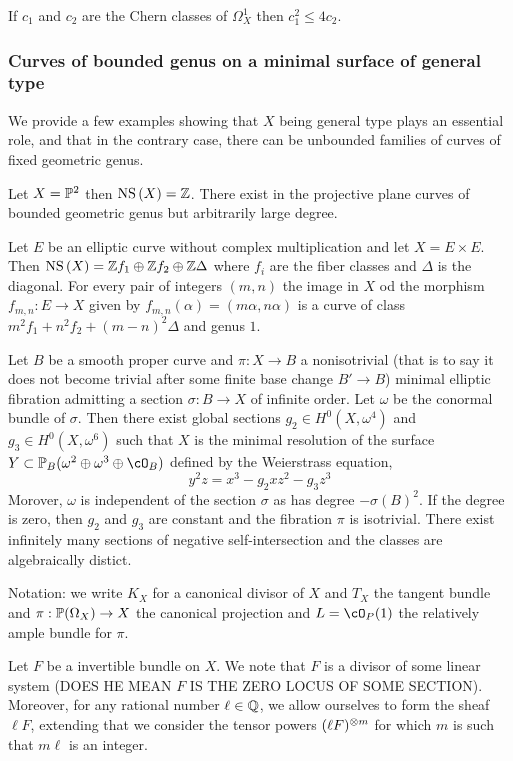 \documentclass[12pt]{article}
\begin{document}
\begin{cor}
If $c_1$ and $c_2$ are the Chern classes of $\Omega^1_X$ then $c_1^2 \le 4 c_2$. 
\end{cor}

\subsubsection{Curves of bounded genus on a minimal surface of general type}

We provide a few examples showing that $X$ being general type plays an essential role, and that in the contrary case, there can be unbounded families of curves of fixed geometric genus.

\begin{example}
Let $X = \P^2$ then $\NS{X} = \Z$. There exist in the projective plane curves of bounded geometric genus but arbitrarily large degree.
\end{example} 

\begin{example}
Let $E$ be an elliptic curve without complex multiplication and let $X = E \times E$. Then $\NS{X} = \Z f_1 \oplus \Z f_2 \oplus \Z \Delta$ where $f_i$ are the fiber classes and $\Delta$ is the diagonal. For every pair of integers $(m, n)$ the image in $X$ od the morphism $f_{m,n} : E \to X$ given by $f_{m,n}(\alpha) = (m \alpha, n \alpha)$ is a curve of class $m^2 f_1 + n^2 f_2 + (m-n)^2 \Delta$ and genus $1$.
\end{example}

\begin{example}
Let $B$ be a smooth proper curve and $\pi : X \to B$ a nonisotrivial (that is to say it does not become trivial after some finite base change $B' \to B$) minimal elliptic fibration admitting a section $\sigma : B \to X$ of infinite order. Let $\omega$ be the conormal bundle of $\sigma$. Then there exist global sections $g_2 \in H^0(X, \omega^4)$ and $g_3 \in H^0(X, \omega^6)$ such that $X$ is the minimal resolution of the surface $Y \subset \P_B(\omega^2 \oplus \omega^3 \oplus \cO_B)$ defined by the Weierstrass equation,
\[ y^2 z = x^3 - g_2 x z^2 - g_3 z^3 \]
Morover, $\omega$ is independent of the section $\sigma$ as has degree $- \sigma(B)^2$. If the degree is zero, then $g_2$ and $g_3$ are constant and the fibration $\pi$ is isotrivial. There exist infinitely many sections of negative self-intersection and the classes are algebraically distict. 
\end{example}

Notation: we write $K_X$ for a canonical divisor of $X$ and $T_X$ the tangent bundle and $\pi : \P(\Omega_X) \to X$ the canonical projection and $L = \cO_P(1)$ the relatively ample bundle for $\pi$.
\par 
Let $F$ be a invertible bundle on $X$. We note that $F$ is a divisor of some linear system (DOES HE MEAN $F$ IS THE ZERO LOCUS OF SOME SECTION). Moreover, for any rational number $\ell \in \QQ$, we allow ourselves to form the sheaf $\ell F$, extending that we consider the tensor powers $(\ell F)^{\ot m}$ for which $m$ is such that $m \ell$ is an integer.
\end{document}
